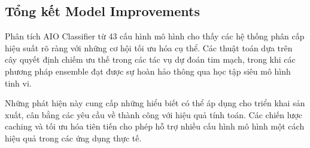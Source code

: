 \subsection{Tổng kết Model Improvements}

\noindent
Phân tích AIO Classifier từ 43 cấu hình mô hình cho thấy các hệ thống phân cấp hiệu suất rõ ràng với những cơ hội tối ưu hóa cụ thể. Các thuật toán dựa trên cây quyết định chiếm ưu thế trong các tác vụ dự đoán tim mạch, trong khi các phương pháp ensemble đạt được sự hoàn hảo thông qua học tập siêu mô hình tinh vi.

Những phát hiện này cung cấp những hiểu biết có thể áp dụng cho triển khai sản xuất, cân bằng các yêu cầu về thành công với hiệu quả tính toán. Các chiến lược caching và tối ưu hóa tiên tiến cho phép hỗ trợ nhiều cấu hình mô hình một cách hiệu quả trong các ứng dụng thực tế.